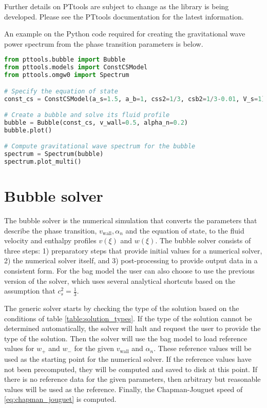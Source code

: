 Further details on PTtools are subject to change as the library is being developed.
Please see the PTtools documentation for the latest information.

An example on the Python code required for creating the gravitational wave power spectrum from the phase transition parameters is below.
\begin{lstlisting}[language=Python]
from pttools.bubble import Bubble
from pttools.models import ConstCSModel
from pttools.omgw0 import Spectrum

# Specify the equation of state
const_cs = ConstCSModel(a_s=1.5, a_b=1, css2=1/3, csb2=1/3-0.01, V_s=1)

# Create a bubble and solve its fluid profile
bubble = Bubble(const_cs, v_wall=0.5, alpha_n=0.2)
bubble.plot()

# Compute gravitational wave spectrum for the bubble
spectrum = Spectrum(bubble)
spectrum.plot_multi()    
\end{lstlisting}


\section{Bubble solver}
The bubble solver is the numerical simulation that converts the parameters that describe the phase transition, $v_{\text{wall}}, \alpha_n$ and the equation of state, to the fluid velocity and enthalpy profiles $v(\xi)$ and $w(\xi)$.
The bubble solver consists of three steps:
1) preparatory steps that provide initial values for a numerical solver,
2) the numerical solver itself, and
3) post-processing to provide output data in a consistent form.
For the bag model the user can also choose to use the previous version of the solver,
which uses several analytical shortcuts based on the assumption that $c_s^2 = \frac{1}{3}$.

The generic solver starts by checking the type of the solution based on the conditions of table \ref{table:solution_types}.
If the type of the solution cannot be determined automatically, the solver will halt and request the user to provide the type of the solution.
Then the solver will use the bag model to load reference values for $w_+$ and $w_-$ for the given $v_\text{wall}$ and $\alpha_n$.
These reference values will be used as the starting point for the numerical solver.
If the reference values have not been precomputed,
they will be computed and saved to disk at this point.
If there is no reference data for the given parameters,
then arbitrary but reasonable values will be used as the reference.
Finally, the Chapman-Jouguet speed of \eqref{eq:chapman_jouguet} is computed.

